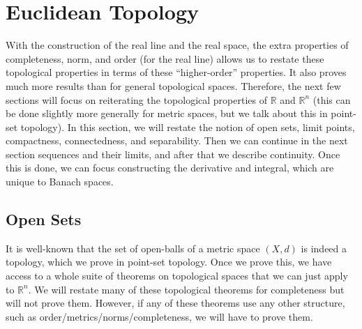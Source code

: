 \section{Euclidean Topology} 

  With the construction of the real line and the real space, the extra properties of completeness, norm, and order (for the real line) allows us to restate these topological properties in terms of these ``higher-order'' properties. It also proves much more results than for general topological spaces. Therefore, the next few sections will focus on reiterating the topological properties of $\mathbb{R}$ and $\mathbb{R}^n$ (this can be done slightly more generally for metric spaces, but we talk about this in point-set topology). In this section, we will restate the notion of open sets, limit points, compactness, connectedness, and separability. Then we can continue in the next section sequences and their limits, and after that we describe continuity. Once this is done, we can focus constructing the derivative and integral, which are unique to Banach spaces.  

\subsection{Open Sets} 

  It is well-known that the set of open-balls of a metric space $(X, d)$ is indeed a topology, which we prove in point-set topology. Once we prove this, we have access to a whole suite of theorems on topological spaces that we can just apply to $\mathbb{R}^n$. We will restate many of these topological theorems for completeness but will not prove them. However, if any of these theorems use any other structure, such as order/metrics/norms/completeness, we will have to prove them. 

